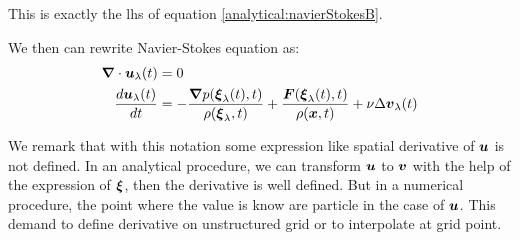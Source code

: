 This is exactly the lhs of equation \ref{analytical:navierStokesB}.

We then can rewrite Navier-Stokes equation as:
\begin{subequations}
\begin{align}
\label{analytical:navierStokesLagA}
{\boldsymbol {\nabla}} \cdot {\boldsymbol {u}}_{\lambda}(t)&=0\\
\label{analytical:navierStokesLagB}
\frac{d {\boldsymbol {u}}_{\lambda}(t)}{d t}&=-\frac{{\boldsymbol {\nabla}} p({\boldsymbol {\xi}}_{\lambda}(t),t)}{\rho({\boldsymbol {\xi}}_{\lambda},t)}+\frac{{\boldsymbol {F}}({\boldsymbol {\xi}}_{\lambda}(t),t)}{\rho({\boldsymbol {x}},t)}+\nu \Delta {\boldsymbol {v}}_{\lambda}(t)
\end{align}
\end{subequations}

\begin{remark}
We remark that with this notation some expression like spatial derivative of ${\boldsymbol {u}}$ is not defined.
In an analytical procedure, we can transform ${\boldsymbol {u}}$ to ${\boldsymbol {v}}$ with the help of the expression of ${\boldsymbol {\xi}}$, then the derivative is well defined.
But in a numerical procedure, the point where the value is know are particle in the case of ${\boldsymbol {u}}$. This demand to define derivative on unstructured grid
or to interpolate at grid point.
\end{remark}

